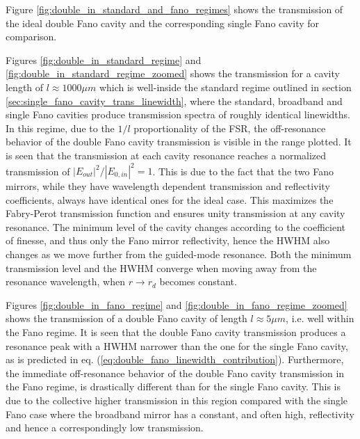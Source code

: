 Figure \ref{fig:double_in_standard_and_fano_regimes} shows the transmission of the ideal double Fano cavity and the corresponding single Fano cavity for comparison. 

Figures \ref{fig:double_in_standard_regime} and \ref{fig:double_in_standard_regime_zoomed} shows the transmission for a cavity length of $l \approx 1000 \mu m$ which is well-inside the standard regime outlined in section \ref{sec:single_fano_cavity_trans_linewidth}, where the standard, broadband and single Fano cavities produce transmission spectra of roughly identical linewidths. In this regime, due to the $1/l$ proportionality of the FSR, the off-resonance behavior of the double Fano cavity transmission is visible in the range plotted. It is seen that the transmission at each cavity resonance reaches a normalized transmission of $|E_{out}|^2/|E_{0,in}|^2=1$. This is due to the fact that the two Fano mirrors, while they have wavelength dependent transmission and reflectivity coefficients, always have identical ones for the ideal case. This maximizes the Fabry-Perot transmission function and ensures unity transmission at any cavity resonance. The minimum level of the cavity changes according to the coefficient of finesse, and thus only the Fano mirror reflectivity, hence the HWHM also changes as we move further from the guided-mode resonance. Both the minimum transmission level and the HWHM converge when moving away from the resonance wavelength, when $r \rightarrow r_d$ becomes constant. 

Figures \ref{fig:double_in_fano_regime} and \ref{fig:double_in_fano_regime_zoomed} shows the transmission of a double Fano cavity of length $l \approx 5 \mu m$, i.e. well within the Fano regime. It is seen that the double Fano cavity transmission produces a resonance peak with a HWHM narrower than the one for the single Fano cavity, as is predicted in eq. (\ref{eq:double_fano_linewidth_contribution}). Furthermore, the immediate off-resonance behavior of the double Fano cavity transmission in the Fano regime, is drastically different than for the single Fano cavity. This is due to the collective higher transmission in this region compared with the single Fano case where the broadband mirror has a constant, and often high, reflectivity and hence a correspondingly low transmission.

